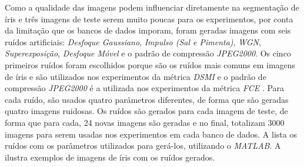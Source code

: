 \par Como a qualidade das imagens podem influenciar diretamente na segmentação de íris e três imagens de teste serem muito poucas para os experimentos, por conta da limitação que os bancos de dados imporam, foram geradas imagens com seis ruídos artificiais: \textit{Desfoque Gaussiano}, \textit{Impulso (Sal e Pimenta)}, \textit{\acrfull{WGN}}, \textit{Superexposição}, \textit{Desfoque Móvel} e o padrão de compressão \textit{JPEG2000}. Os cinco primeiros ruídos foram escolhidos porque são os ruídos mais comuns em imagens de íris e são utilizados nos experimentos da métrica \textit{\acrshort{DSMI}} \cite{Jenadeleh_2018_CVPR_Workshops} e o padrão de compressão \textit{JPEG2000} é a utilizada nos experimentos da métrica \textit{\acrshort{FCE}} \cite{du2010}. Para cada ruído, são usados quatro parâmetros diferentes, de forma que são geradas quatro imagens ruidosas. Os ruídos são gerados para cada imagem de teste, de forma que para cada, 24 novas imagens são geradas e no final, totalizam 3000 imagens para serem usadas nos experimentos em cada banco de dados.  A  lista os ruídos com os parâmetros utilizados para gerá-los, utilizando o \textit{MATLAB}. A  ilustra exemplos de imagens de íris com os ruídos gerados.


